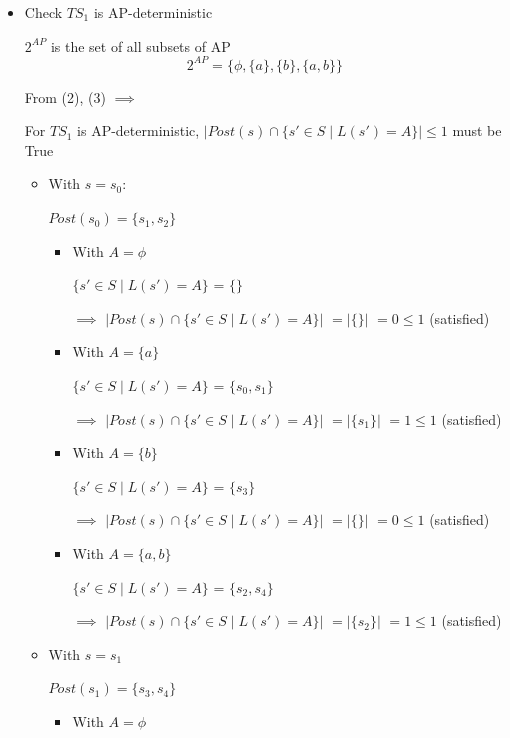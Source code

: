 \documentclass[a4paper,12pt]{article}
\begin{document}
\begin{itemize}
    \item Check $TS_1$ is AP-deterministic
    
    $2^{AP}$ is the set of all subsets of AP
    $$2^{AP} = \{\phi, \{a\}, \{b\}, \{a, b\}\}$$

    From (2), (3) $\implies$ 
    
    For $TS_1$ is AP-deterministic, $\left|Post(s) \cap \{s' \in S \mid L(s') = A\}\right| \leq 1$ must be True
    \begin{itemize}
        \item With $s = s_0$:

            $Post(s_0) = \{s_1, s_2\}$

            \begin{itemize}
                \item[-] With $A = \phi$
                
                $\{s' \in S \mid L(s') = A\}$ = $\{\}$

                $\implies$  $\left|Post(s) \cap \{s' \in S \mid L(s') = A\}\right|$ $= \left|\{\}\right|$ $= 0 \leq 1$ (satisfied)
                \item[-] With $A = \{a\}$
                
                $\{s' \in S \mid L(s') = A\}$ = $\{s_0, s_1\}$

                $\implies$ $\left|Post(s) \cap \{s' \in S \mid L(s') = A\}\right|$ $= \left|\{s_1\}\right|$ $= 1 \leq 1$ (satisfied)
                \item[-] With $A = \{b\}$
            
                 $\{s' \in S \mid L(s') = A\}$ = $\{s_3\}$

                 $\implies$ $\left|Post(s) \cap \{s' \in S \mid L(s') = A\}\right|$ $= \left|\{\}\right|$ $= 0 \leq 1$ (satisfied)
                \item[-] With $A = \{a, b\}$ 
                
                 $\{s' \in S \mid L(s') = A\}$ = $\{s_2, s_4\}$

                 $\implies$ $\left|Post(s) \cap \{s' \in S \mid L(s') = A\}\right|$ $= \left|\{s_2\}\right|$ $= 1 \leq 1$ (satisfied)
            \end{itemize} 
        \item With $s = s_1$
           
            $Post(s_1) = \{s_3, s_4\}$

            \begin{itemize}
                \item[-] With $A = \phi$
                

\end{itemize}
\end{itemize}
\end{itemize}
\end{document}
